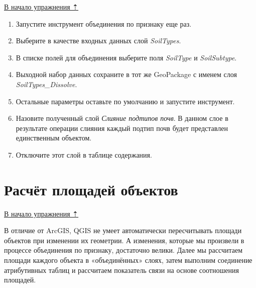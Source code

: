 \documentclass[
  12pt,
]{book}
\begin{document}
\protect\hyperlink{overlay}{В начало упражнения ⇡}

\begin{enumerate}
\def\labelenumi{\arabic{enumi}.}
\item
  Запустите инструмент объединения по признаку еще раз.
\item
  Выберите в качестве входных данных слой \emph{SoilTypes}.
\item
  В списке полей для объединения выберите поля \emph{SoilType} и \emph{SoilSubtype}.
\item
  Выходной набор данных сохраните в тот же GeoPackage с именем слоя \emph{SoilTypes\_Dissolve}.
\item
  Остальные параметры оставьте по умолчанию и запустите инструмент.
\item
  Назовите полученный слой \emph{Слияние подтипов почв}. В данном слое в результате операции слияния каждый подтип почв будет представлен единственным объектом.
\item
  Отключите этот слой в таблице содержания.
\end{enumerate}

\hypertarget{overlay-fieldcalc}{%
\section{Расчёт площадей объектов}\label{overlay-fieldcalc}}

\protect\hyperlink{overlay}{В начало упражнения ⇡}

В отличие от ArcGIS, QGIS не умеет автоматически пересчитывать площади объектов при изменении их геометрии. А изменения, которые мы произвели в процессе объединения по признаку, достаточно велики. Далее мы рассчитаем площади каждого объекта в «объединённых» слоях, затем выполним соединение атрибутивных таблиц и рассчитаем показатель связи на основе соотношения площадей.
\end{document}
